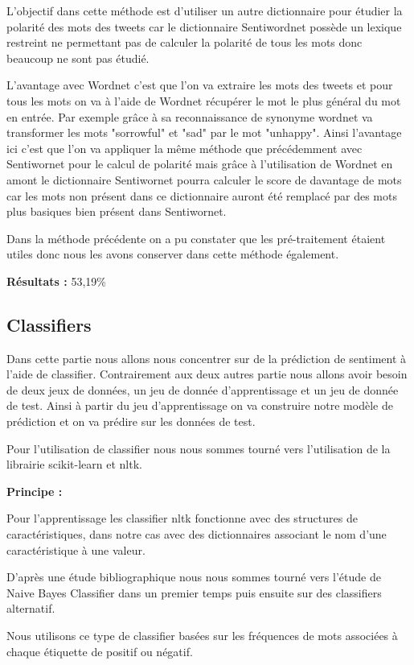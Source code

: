 \par L'objectif dans cette méthode est d'utiliser un autre dictionnaire pour étudier la polarité des mots des tweets car le dictionnaire Sentiwordnet possède un lexique restreint ne permettant pas de calculer la polarité de tous les mots donc beaucoup ne sont pas étudié. \\

\par L'avantage avec Wordnet c'est que l'on va extraire les mots des tweets et pour tous les mots on va à l'aide de Wordnet récupérer le mot le plus général du mot en entrée. Par exemple grâce à sa reconnaissance de synonyme wordnet va transformer les mots "sorrowful" et "sad" par le mot "unhappy". Ainsi l'avantage ici c'est que l'on va appliquer la même méthode que précédemment avec Sentiwornet pour le calcul de polarité mais grâce à l'utilisation de Wordnet en amont le dictionnaire Sentiwornet pourra calculer le score de davantage de mots car les mots non présent dans ce dictionnaire auront été remplacé par des mots plus basiques bien présent dans Sentiwornet. \\ 

\par Dans la méthode précédente on a pu constater que les pré-traitement étaient utiles donc nous les avons conserver dans cette méthode également. \\

\par\textbf{ Résultats : } 53,19\%

\subsection{Classifiers}

\par Dans cette partie nous allons nous concentrer sur de la prédiction de sentiment à l'aide de classifier. Contrairement aux deux autres partie nous allons avoir besoin de deux jeux de données, un jeu de donnée d'apprentissage et un jeu de donnée de test. Ainsi à partir du jeu d'apprentissage on va construire notre modèle de prédiction et on va prédire sur les données de test. \\

\par Pour l'utilisation de classifier nous nous sommes tourné vers l'utilisation de la librairie scikit-learn et nltk. \\

\par \textbf{Principe : } \\
\par Pour l'apprentissage les classifier nltk fonctionne avec des structures de caractéristiques, dans notre cas avec des dictionnaires associant le nom d'une caractéristique à une valeur. 
\par D'après une étude bibliographique nous nous sommes tourné vers l'étude de Naive Bayes Classifier dans un premier temps puis ensuite sur des classifiers alternatif.  
\par Nous utilisons ce type de classifier basées sur les fréquences de mots associées à chaque étiquette de positif ou négatif. \\

